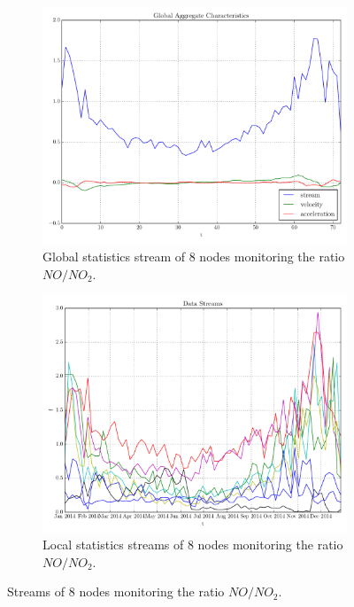 \begin{figure}[t!]
\centering
\begin{subfigure}[t]{0.49\textwidth}
\centering
\includegraphics[scale=0.38, trim=2cm 0 0 0]{img/AT_NO2_NO_2014_8N_global.pdf}
\caption{Global statistics stream of 8 nodes monitoring the ratio $NO/NO_2$.}
\end{subfigure}
\begin{subfigure}[t]{0.49\textwidth}
\centering
\includegraphics[scale=0.38]{img/AT_NO2_NO_2014_8N_streams.pdf}
\caption{Local statistics streams of 8 nodes monitoring the ratio $NO/NO_2$.} 
\end{subfigure}
\vspace{0.5cm}
\caption{Streams of 8 nodes monitoring the ratio $NO/NO_2$.}\label{fig:NO2_NO}
\end{figure}

